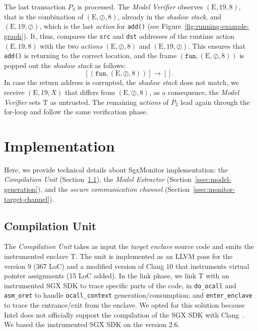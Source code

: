 The last transaction $P_3$ is processed. The \emph{Model Verifier} 
observes $(\text{E}, 19, 8)$, that is the combination of $(\text{E}, \oslash, 
8)$, already in the \emph{shadow stack}, and $(\text{E}, 19, \oslash)$, which 
is the 
last \emph{action} for \texttt{add()} (see 
Figure~\ref{fig:running-example-graph}).
It, thus, compares the \texttt{src} and \texttt{dst} addresses
of the runtime action $(\text{E}, 19, 8)$ with the two \emph{actions} 
$(\text{E}, \oslash, 8)$ and $(\text{E}, 19, \oslash)$.
This ensures that \texttt{add()} is returning to the correct location, and 
the frame $(\texttt{fun}, (\text{E}, \oslash, 8))$ is popped out the 
\emph{shadow stack} as follows:
$$
[(\texttt{fun}, (\text{E}, \oslash, 8))] \rightarrow [].
$$
In case the return address is corrupted, the \emph{shadow stack} does not 
match, 
\eg we receive $(\text{E}, 19, X)$ that differs from $(\text{E}, \oslash, 8)$,
as a consequence, the \emph{Model Verifier} sets T as untrusted.
The remaining \emph{actions} of $P_3$ lead again through the for-loop and follow
the same verification phase.

\section{Implementation}
\label{sec:implementation}

Here, we provide technical details about SgxMonitor implementation: the 
\emph{Compilation Unit} 
(Section~\ref{ssec:compilation-unit}), the \emph{Model 
	Extractor} (Section~\ref{ssec:model-generation}), and the 
\emph{secure communication channel} (Section~\ref{ssec:monitor-target-channel}).

\subsection{Compilation Unit}
\label{ssec:compilation-unit}

The \emph{Compilation Unit} takes as input the \emph{target enclave} source code
and emits the instrumented enclave T.
The unit is implemented as an LLVM pass for the version $9$ (367 LoC) and a 
modified version of Clang $10$ that instruments virtual pointer assignments (15 
LoC added).
In the link phase, we link T with an instrumented SGX SDK to trace specific 
parts of the code, \eg
in \texttt{do\_ocall} and \texttt{asm\_oret} to handle 
\texttt{ocall\_context} generation/consumption; and \texttt{enter\_enclave}
to trace the entrance/exit from the enclave.
We opted for this solution because Intel does not officially support the 
compilation of the SGX SDK with Clang~\citep{sgxclang}.
We based the instrumented SGX SDK on the version $2.6$.

